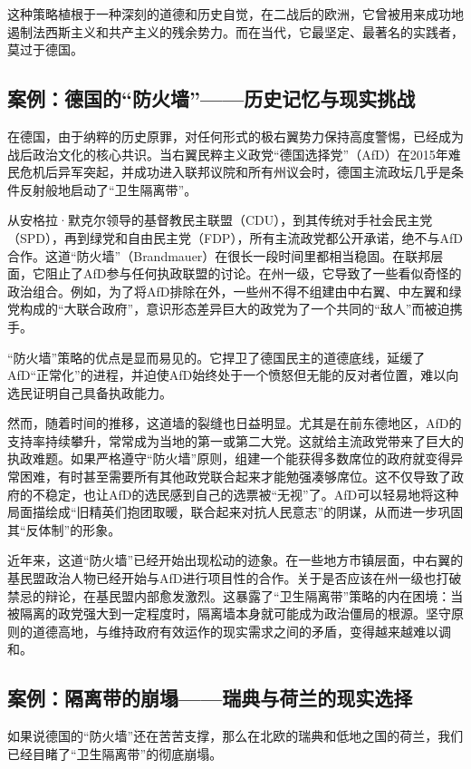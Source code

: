 这种策略植根于一种深刻的道德和历史自觉，在二战后的欧洲，它曾被用来成功地遏制法西斯主义和共产主义的残余势力。而在当代，它最坚定、最著名的实践者，莫过于德国。

\subsection{案例：德国的“防火墙”——历史记忆与现实挑战}

在德国，由于纳粹的历史原罪，对任何形式的极右翼势力保持高度警惕，已经成为战后政治文化的核心共识。当右翼民粹主义政党“德国选择党”（AfD）在2015年难民危机后异军突起，并成功进入联邦议院和所有州议会时，德国主流政坛几乎是条件反射般地启动了“卫生隔离带”。

从安格拉·默克尔领导的基督教民主联盟（CDU），到其传统对手社会民主党（SPD），再到绿党和自由民主党（FDP），所有主流政党都公开承诺，绝不与AfD合作。这道“防火墙”（Brandmauer）在很长一段时间里都相当稳固。在联邦层面，它阻止了AfD参与任何执政联盟的讨论。在州一级，它导致了一些看似奇怪的政治组合。例如，为了将AfD排除在外，一些州不得不组建由中右翼、中左翼和绿党构成的“大联合政府”，意识形态差异巨大的政党为了一个共同的“敌人”而被迫携手。

“防火墙”策略的优点是显而易见的。它捍卫了德国民主的道德底线，延缓了AfD“正常化”的进程，并迫使AfD始终处于一个愤怒但无能的反对者位置，难以向选民证明自己具备执政能力。

然而，随着时间的推移，这道墙的裂缝也日益明显。尤其是在前东德地区，AfD的支持率持续攀升，常常成为当地的第一或第二大党。这就给主流政党带来了巨大的执政难题。如果严格遵守“防火墙”原则，组建一个能获得多数席位的政府就变得异常困难，有时甚至需要所有其他政党联合起来才能勉强凑够席位。这不仅导致了政府的不稳定，也让AfD的选民感到自己的选票被“无视”了。AfD可以轻易地将这种局面描绘成“旧精英们抱团取暖，联合起来对抗人民意志”的阴谋，从而进一步巩固其“反体制”的形象。

近年来，这道“防火墙”已经开始出现松动的迹象。在一些地方市镇层面，中右翼的基民盟政治人物已经开始与AfD进行项目性的合作。关于是否应该在州一级也打破禁忌的辩论，在基民盟内部愈发激烈。这暴露了“卫生隔离带”策略的内在困境：当被隔离的政党强大到一定程度时，隔离墙本身就可能成为政治僵局的根源。坚守原则的道德高地，与维持政府有效运作的现实需求之间的矛盾，变得越来越难以调和。

\subsection{案例：隔离带的崩塌——瑞典与荷兰的现实选择}

如果说德国的“防火墙”还在苦苦支撑，那么在北欧的瑞典和低地之国的荷兰，我们已经目睹了“卫生隔离带”的彻底崩塌。

